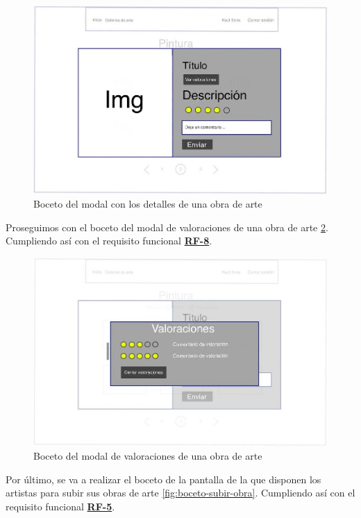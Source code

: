 \begin{figure}[H]
  \centering
  \includegraphics[width=\textwidth]{img/modal}
  \caption{Boceto del modal con los detalles de una obra de arte}
  \label{fig:boceto-obra}
\end{figure}

Proseguimos con el boceto del modal de valoraciones de una obra de arte
\ref{fig:boceto-valoraciones}. Cumpliendo así con el requisito funcional
\hyperref[tab:rf-8]{\textbf{RF-8}}.

\begin{figure}[H]
  \centering
  \includegraphics[width=\textwidth]{img/valoraciones}
  \caption{Boceto del modal de valoraciones de una obra de arte}
  \label{fig:boceto-valoraciones}
\end{figure}

Por último, se va a realizar el boceto de la pantalla de la que disponen los artistas para
subir sus obras de arte \ref{fig:boceto-subir-obra}. Cumpliendo así con el requisito
funcional \hyperref[tab:rf-5]{\textbf{RF-5}}.

